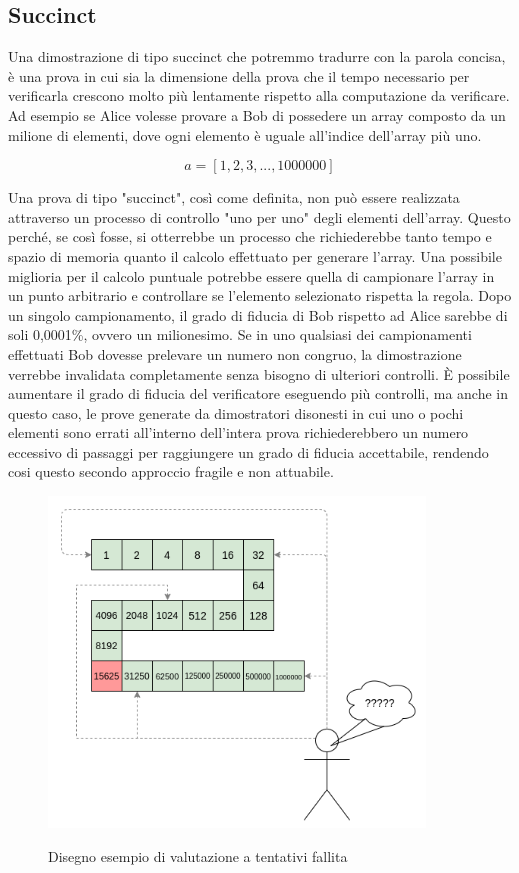 \subsection{Succinct}
Una dimostrazione di tipo succinct che potremmo tradurre con la parola concisa, è una prova in cui sia la dimensione
della prova che il tempo necessario per verificarla crescono molto più lentamente rispetto alla computazione da
verificare. Ad esempio se Alice volesse provare a Bob di possedere un array composto da un milione di elementi, dove
ogni elemento è uguale all’indice dell’array più uno.

\begin{equation}
a = [1,2,3,...,1000000]
\end{equation}

Una prova di tipo "succinct", così come definita, non può essere realizzata attraverso un processo di controllo "uno per
uno" degli elementi dell'array. Questo perché, se così fosse, si otterrebbe un processo che richiederebbe tanto tempo e
spazio di memoria quanto il calcolo effettuato per generare l'array. Una possibile miglioria per il calcolo puntuale
potrebbe essere quella di campionare l'array in un punto arbitrario e controllare se l'elemento selezionato rispetta la
regola. Dopo un singolo campionamento, il grado di fiducia di Bob rispetto ad Alice sarebbe di soli 0,0001\%, ovvero un
milionesimo. Se in uno qualsiasi dei campionamenti effettuati Bob dovesse prelevare un numero non congruo, la
dimostrazione verrebbe invalidata completamente senza bisogno di ulteriori controlli. È possibile aumentare il grado di
fiducia del verificatore eseguendo più controlli, ma anche in questo caso, le prove generate da dimostratori disonesti
in cui uno o pochi elementi sono errati all'interno dell'intera prova richiederebbero un numero eccessivo di passaggi
per raggiungere un grado di fiducia accettabile, rendendo cosi questo secondo approccio fragile e non attuabile.

\begin{figure}[H]
    \centering
    \includegraphics[width=10cm]{./chapters/1.state-of-art/images/6.hope_evaluation.png}
    \label{fig:hope-evaluation}
    \captionsetup{justification=centering}
    \caption{Disegno esempio di valutazione a tentativi fallita}
\end{figure}

